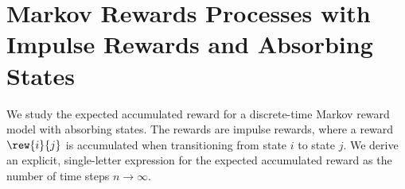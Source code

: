 \section{Markov Rewards Processes with Impulse Rewards and Absorbing States}
\label{sec:markov}

	We study the expected accumulated reward for a discrete-time Markov reward model with absorbing states. The rewards are impulse rewards, where a reward $\rew{i}{j}$ is accumulated when transitioning from state $i$ to state $j$.  We derive an explicit, single-letter expression for the expected accumulated reward as the number of time steps $n \to \infty$.






%

